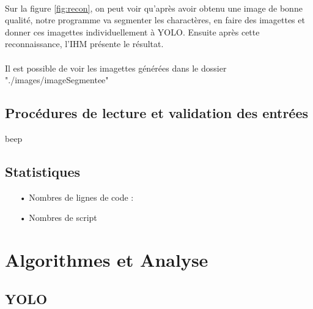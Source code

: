 \documentclass[a4paper]{article}
\begin{document}
			\paragraph{}Sur la figure \ref{fig:recon}, on peut voir qu'après avoir obtenu une image de bonne qualité, notre programme va segmenter les charactères, en faire des imagettes et donner ces imagettes individuellement à YOLO. Ensuite après cette reconnaissance, l'IHM présente le résultat.
			\paragraph{}Il est possible de voir les imagettes générées dans le dossier "./images/imageSegmentee"
		\subsection{Procédures de lecture et validation des entrées}
			beep	
		\subsection{Statistiques}
			\begin{itemize}
				\item[•] Nombres de lignes de code : 
				\item[•] Nombres de script
			\end{itemize}
	\section{Algorithmes et Analyse}
		\subsection{YOLO}
\end{document}
